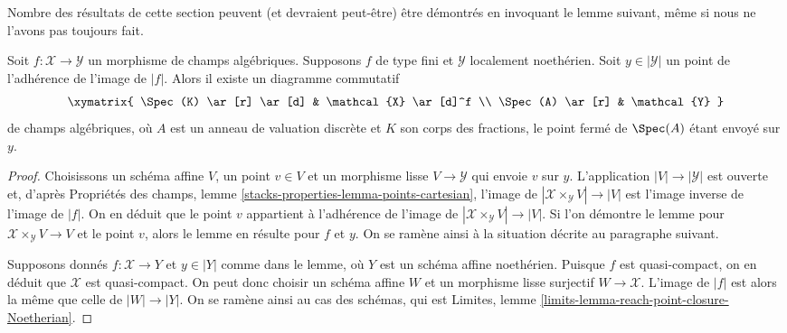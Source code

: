 \medskip\noindent
Nombre des résultats de cette section peuvent (et devraient peut-être)
être démontrés en invoquant le lemme suivant, même si nous ne l'avons pas
toujours fait.

\begin{lemma}
\label{lemma-reach-point-closure-Noetherian}
Soit $f : \mathcal{X} \to \mathcal{Y}$ un morphisme de champs algébriques.
Supposons $f$ de type fini et $\mathcal{Y}$ localement noethérien.
Soit $y \in |\mathcal{Y}|$ un point de l'adhérence de l'image de $|f|$.
Alors il existe un diagramme commutatif
$$
\xymatrix{
\Spec(K) \ar[r] \ar[d] & \mathcal{X} \ar[d]^f \\
\Spec(A) \ar[r] & \mathcal{Y}
}
$$
de champs algébriques, où $A$ est un anneau de valuation discrète et $K$
son corps des fractions, le point fermé de $\Spec(A)$ étant envoyé sur $y$.
\end{lemma}

\begin{proof}
Choisissons un schéma affine $V$, un point $v \in V$ et un morphisme lisse
$V \to \mathcal{Y}$ qui envoie $v$ sur $y$. L'application $|V| \to |\mathcal{Y}|$
est ouverte et, d'après
Propriétés des champs, lemme \ref{stacks-properties-lemma-points-cartesian},
l'image de $|\mathcal{X} \times_\mathcal{Y} V| \to |V|$
est l'image inverse de l'image de $|f|$.
On en déduit que le point $v$ appartient à l'adhérence de
l'image de $|\mathcal{X} \times_\mathcal{Y} V| \to |V|$.
Si l'on démontre le lemme pour
$\mathcal{X} \times_\mathcal{Y} V \to V$ et le point $v$, alors
le lemme en résulte pour $f$ et $y$.
On se ramène ainsi à la situation décrite au
paragraphe suivant.

\medskip\noindent
Supposons donnés $f : \mathcal{X} \to Y$ et $y \in |Y|$ comme dans le lemme, où
$Y$ est un schéma affine noethérien. Puisque $f$ est quasi-compact, on en déduit que
$\mathcal{X}$ est quasi-compact. On peut donc choisir un schéma affine $W$ et
un morphisme lisse surjectif $W \to \mathcal{X}$. L'image de
$|f|$ est alors la même que celle de $|W| \to |Y|$. On se ramène ainsi
au cas des schémas, qui est
Limites, lemme \ref{limits-lemma-reach-point-closure-Noetherian}.
\end{proof}

